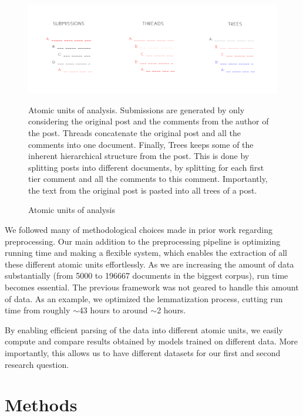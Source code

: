\documentclass{article}
\begin{document}
\begin{figure}[H]
    \begin{centering}
    \includegraphics[scale=0.45]{../Figure/atomic_units.jpg}
    \caption{Atomic units of analysis}
    \end{centering}
    \begin{footnotesize} 
        Atomic units of analysis. Submissions are generated by only considering the original post and the comments from the author of the post. Threads concatenate the original post and all the comments into one document. Finally, Trees keeps some of the inherent hierarchical structure from the post. This is done by splitting posts into different documents, by splitting for each first tier comment and all the comments to this comment. Importantly, the text from the original post is pasted into all trees of a post.
    \end{footnotesize}
\end{figure}

We followed many of methodological choices made in prior work regarding preprocessing. Our main addition to the preprocessing pipeline is optimizing running time and making a flexible system, which enables the extraction of all these different atomic units effortlessly. As we are increasing the amount of data substantially (from 5000 to 196667 documents in the biggest corpus), run time becomes essential. The previous framework was not geared to handle this amount of data. As an example, we optimized the lemmatization process, cutting run time from roughly $\sim$43 hours to around $\sim$2 hours. 

By enabling efficient parsing of the data into different atomic units, we easily compute and compare results obtained by models trained on different data. More importantly, this allows us to have different datasets for our first and second research question. 

    \section{Methods}
\end{document}

